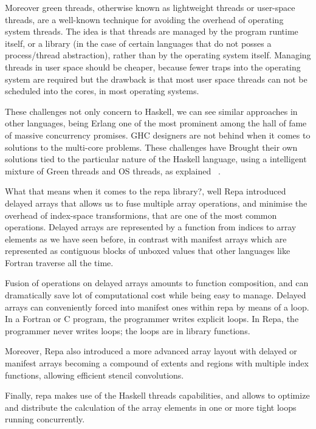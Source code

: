\documentclass{tmr}
\begin{document}
Moreover green threads, otherwise known as lightweight threads
or user-space threads, are a well-known technique for avoiding the overhead 
of operating system threads. The idea is that threads are managed by the 
program runtime itself, or a library (in the case of certain languages 
that do not posses a process/thread abstraction), rather than by the operating system itself. 
Managing threads in user space should be cheaper, because fewer traps into 
the operating system are required but the drawback is that most user space threads 
can not be scheduled into the cores, in most operating systems.

These challenges not only concern to Haskell, we can see similar approaches
in other languages, being Erlang one of the most prominent among the hall of 
fame of massive concurrency promises. GHC designers are not behind when it 
comes to solutions to the multi-core problems. These challenges have Brought their
own solutions tied to the particular nature of the Haskell language,
 using a intelligent mixture of Green threads and OS threads,
as explained ~\cite{Peyton}.

What that means when it comes to the repa library?, well Repa introduced
delayed arrays that allows us to fuse multiple array operations, and 
minimise the overhead of index-space transformions, that are one of the most
common operations. Delayed arrays are represented by a function from indices 
to array elements as we have seen before, in contrast with manifest arrays
which are represented as contiguous blocks of unboxed values that other 
languages like Fortran traverse all the time. 

Fusion of operations on delayed arrays amounts to function composition, and 
can dramatically save lot of computational cost while being easy to manage. 
Delayed arrays can conveniently forced into manifest ones within repa by means 
of a loop. In a Fortran or C program, the programmer writes explicit loops. 
In Repa, the programmer never writes loops; the loops are in library functions.

Moreover, Repa also introduced a more advanced array layout with delayed or manifest 
arrays becoming a compound of extents and regions with multiple index functions, 
allowing efficient stencil convolutions.

Finally, repa makes use of the Haskell threads capabilities, and allows to optimize and
distribute the calculation of the array elements in one or more tight loops running concurrently.
\end{document}
